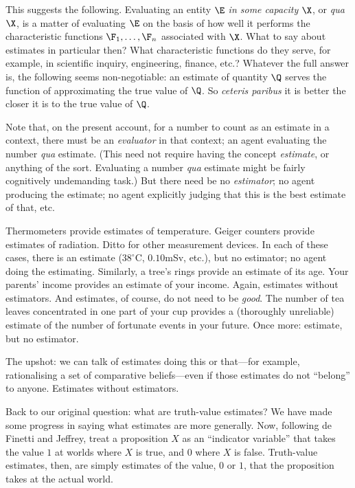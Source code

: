 This suggests the following. Evaluating an entity $\E$ \textit{in some capacity} $\X$, or \textit{qua} $\X$, is a matter of evaluating $\E$ on the basis of how well it performs the characteristic functions $\F_1,\hdots,\F_n$ associated with $\X$. What to say about estimates in particular then? What characteristic functions do they serve, for example, in scientific inquiry, engineering, finance, etc.? Whatever the full answer is, the following seems non-negotiable: an estimate of quantity $\Q$ serves the function of approximating the true value of $\Q$. So \textit{ceteris paribus} it is better the closer it is to the true value of $\Q$.

Note that, on the present account, for a number to count as an estimate in a context, there must be an \textit{evaluator} in that context; an agent evaluating the number \textit{qua} estimate. (This need not require having the concept \textit{estimate}, or anything of the sort. Evaluating a number \textit{qua} estimate might be fairly cognitively undemanding task.) But there need be no \textit{estimator}; no agent producing the estimate; no agent explicitly judging that this is the best estimate of that, etc.

Thermometers provide estimates of temperature. Geiger counters provide estimates of radiation. Ditto for other measurement devices. In each of these cases, there is an estimate ($38^\circ$C, $0.10$mSv, etc.), but no estimator; no agent doing the estimating. Similarly, a tree's rings provide an estimate of its age. Your parents' income provides an estimate of your income. Again, estimates without estimators. And estimates, of course, do not need to be \textit{good}. The number of tea leaves concentrated in one part of your cup provides a (thoroughly unreliable) estimate of the number of fortunate events in your future. Once more: estimate, but no estimator.

The upshot: we can talk of estimates doing this or that---for example, rationalising a set of comparative beliefs---even if those estimates do not ``belong'' to anyone. Estimates without estimators.

Back to our original question: what are truth-value estimates? We have made some progress in saying what estimates are more generally. Now, following de Finetti and Jeffrey, treat a proposition $X$ as an ``indicator variable'' that takes the value $1$ at worlds where $X$ is true, and $0$ where $X$ is false. Truth-value estimates, then, are simply estimates of the value, $0$ or $1$, that the proposition takes at the actual world.

